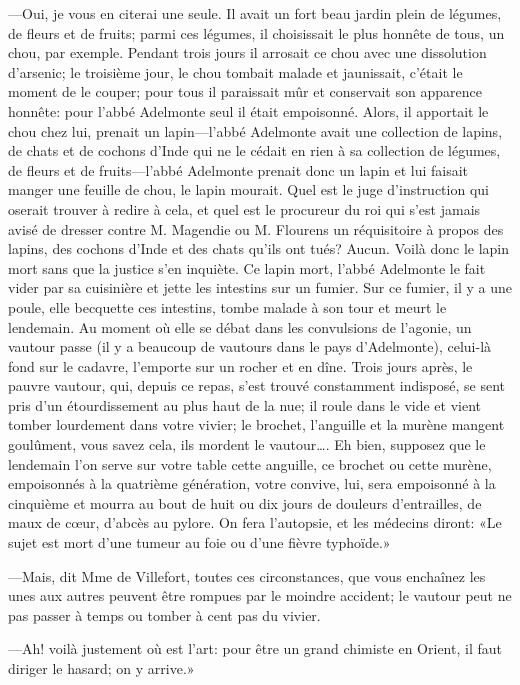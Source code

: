 —Oui, je vous en citerai une seule. Il avait un fort beau jardin plein de légumes, de fleurs et de fruits; parmi ces légumes, il choisissait le plus honnête de tous, un chou, par exemple. Pendant trois jours il arrosait ce chou avec une dissolution d'arsenic; le troisième jour, le chou tombait malade et jaunissait, c'était le moment de le couper; pour tous il paraissait mûr et conservait son apparence honnête: pour l'abbé Adelmonte seul il était empoisonné. Alors, il apportait le chou chez lui, prenait un lapin—l'abbé Adelmonte avait une collection de lapins, de chats et de cochons d'Inde qui ne le cédait en rien à sa collection de légumes, de fleurs et de fruits—l'abbé Adelmonte prenait donc un lapin et lui faisait manger une feuille de chou, le lapin mourait. Quel est le juge d'instruction qui oserait trouver à redire à cela, et quel est le procureur du roi qui s'est jamais avisé de dresser contre M. Magendie ou M. Flourens un réquisitoire à propos des lapins, des cochons d'Inde et des chats qu'ils ont tués? Aucun. Voilà donc le lapin mort sans que la justice s'en inquiète. Ce lapin mort, l'abbé Adelmonte le fait vider par sa cuisinière et jette les intestins sur un fumier. Sur ce fumier, il y a une poule, elle becquette ces intestins, tombe malade à son tour et meurt le lendemain. Au moment où elle se débat dans les convulsions de l'agonie, un vautour passe (il y a beaucoup de vautours dans le pays d'Adelmonte), celui-là fond sur le cadavre, l'emporte sur un rocher et en dîne. Trois jours après, le pauvre vautour, qui, depuis ce repas, s'est trouvé constamment indisposé, se sent pris d'un étourdissement au plus haut de la nue; il roule dans le vide et vient tomber lourdement dans votre vivier; le brochet, l'anguille et la murène mangent goulûment, vous savez cela, ils mordent le vautour\dots. Eh bien, supposez que le lendemain l'on serve sur votre table cette anguille, ce brochet ou cette murène, empoisonnés à la quatrième génération, votre convive, lui, sera empoisonné à la cinquième et mourra au bout de huit ou dix jours de douleurs d'entrailles, de maux de cœur, d'abcès au pylore. On fera l'autopsie, et les médecins diront: «Le sujet est mort d'une tumeur au foie ou d'une fièvre typhoïde.» 

—Mais, dit Mme de Villefort, toutes ces circonstances, que vous enchaînez les unes aux autres peuvent être rompues par le moindre accident; le vautour peut ne pas passer à temps ou tomber à cent pas du vivier. 

—Ah! voilà justement où est l'art: pour être un grand chimiste en Orient, il faut diriger le hasard; on y arrive.» 


